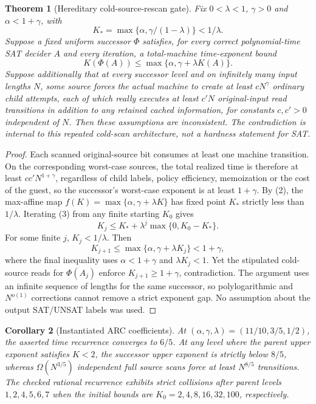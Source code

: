 \documentclass[11pt]{article}
\newtheorem{theorem}{Theorem}
\newtheorem{corollary}[theorem]{Corollary}
\begin{document}
\begin{theorem}[Hereditary cold-source-rescan gate]\label{thm:scan}
Fix $0<\lambda<1$, $\gamma>0$ and $\alpha<1+\gamma$, with
\[
K_*=\max\{\alpha,\gamma/(1-\lambda)\}<1/\lambda.
\tag{2}
\]
Suppose a fixed uniform successor $\Phi$ satisfies, for every correct polynomial-time SAT decider $A$ and every iteration, a total-machine time-exponent bound
\[
K(\Phi(A))\le\max\{\alpha,\gamma+\lambda K(A)\}.
\tag{3}
\]
Suppose additionally that at every successor level and on infinitely many input lengths $N$, some source forces the actual machine to create at least $cN^\gamma$ ordinary child attempts, each of which \emph{really executes} at least $c'N$ original-input read transitions in addition to any retained cached information, for constants $c,c'>0$ independent of $N$. Then these assumptions are inconsistent. The contradiction is internal to this \emph{repeated cold-scan architecture}, not a hardness statement for SAT.
\end{theorem}
\begin{proof}
Each scanned original-source bit consumes at least one machine transition. On the corresponding worst-case sources, the total realized time is therefore at least $cc'N^{1+\gamma}$, regardless of child labels, policy efficiency, memoization or the cost of the guest, so the successor's worst-case exponent is at least $1+\gamma$. By (2), the max-affine map $f(K)=\max\{\alpha,\gamma+\lambda K\}$ has fixed point $K_*$ strictly less than $1/\lambda$. Iterating (3) from any finite starting $K_0$ gives
\[
K_j\le K_*+\lambda^j\max\{0,K_0-K_*\}.
\tag{4}
\]
For some finite $j$, $K_j<1/\lambda$. Then
\[
K_{j+1}\le\max\{\alpha,\gamma+\lambda K_j\}<1+\gamma,
\tag{5}
\]
where the final inequality uses $\alpha<1+\gamma$ and $\lambda K_j<1$. Yet the stipulated cold-source reads for $\Phi(A_j)$ enforce $K_{j+1}\ge1+\gamma$, contradiction. The argument uses an infinite sequence of lengths for the same successor, so polylogarithmic and $N^{o(1)}$ corrections cannot remove a strict exponent gap. No assumption about the output SAT/UNSAT labels was used.
\end{proof}

\begin{corollary}[Instantiated ARC coefficients]
At $(\alpha,\gamma,\lambda)=(11/10,3/5,1/2)$, the asserted time recurrence converges to $6/5$. At any level where the parent upper exponent satisfies $K<2$, the successor upper exponent is strictly below $8/5$, whereas $\Omega(N^{3/5})$ independent full source scans force at least $N^{8/5}$ transitions. The checked rational recurrence exhibits strict collisions after parent levels $1,2,4,5,6,7$ when the initial bounds are $K_0=2,4,8,16,32,100$, respectively.
\end{corollary}
\end{document}
